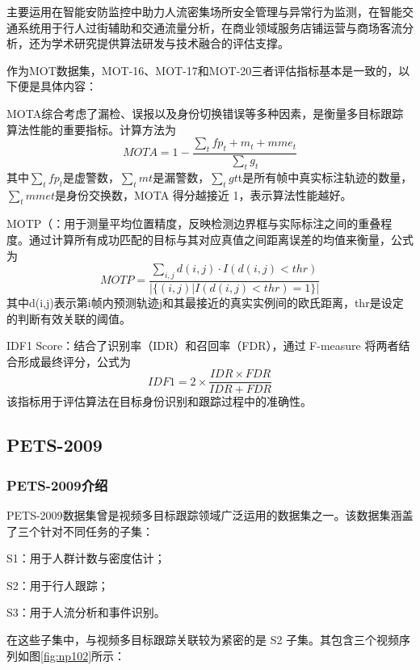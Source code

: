 主要运用在智能安防监控中助力人流密集场所安全管理与异常行为监测，在智能交通系统用于行人过街辅助和交通流量分析，在商业领域服务店铺运营与商场客流分析，还为学术研究提供算法研发与技术融合的评估支撑。




作为MOT数据集，MOT-16、MOT-17和MOT-20三者评估指标基本是一致的，以下便是具体内容：

MOTA综合考虑了漏检、误报以及身份切换错误等多种因素，是衡量多目标跟踪算法性能的重要指标。计算方法为\[MOTA = 1 - \frac{\sum_{t} fp_{t}+m_{t}+mme_{t}}{\sum_{t} g_{t}}\]其中\(\sum_{t} fp_{t}\)是虚警数，\(\sum_{t} m{t}\)是漏警数，\(\sum_{t} g{t}\)t是所有帧中真实标注轨迹的数量，\(\sum_{t} mme{t}\)是身份交换数，MOTA 得分越接近 1，表示算法性能越好。

MOTP（：用于测量平均位置精度，反映检测边界框与实际标注之间的重叠程度。通过计算所有成功匹配的目标与其对应真值之间距离误差的均值来衡量，公式为\[
MOTP = \frac{\sum_{i,j} d(i,j) \cdot I(d(i,j) < thr)}{\left| \{(i,j) | I(d(i,j) < thr) = 1\} \right|}
\]其中d(i,j)表示第i帧内预测轨迹j和其最接近的真实实例间的欧氏距离，thr是设定的判断有效关联的阈值。

IDF1 Score：结合了识别率（IDR）和召回率（FDR），通过 F-measure 将两者结合形成最终评分，公式为\[
IDF1 = 2\times\frac{IDR\times FDR}{IDR + FDR}
\]该指标用于评估算法在目标身份识别和跟踪过程中的准确性。


\subsection{PETS-2009}


\subsubsection{PETS-2009介绍}
PETS-2009\cite{ferryman2009pets2009}数据集曾是视频多目标跟踪领域广泛运用的数据集之一。该数据集涵盖了三个针对不同任务的子集：

S1：用于人群计数与密度估计；

S2：用于行人跟踪；

S3：用于人流分析和事件识别。

在这些子集中，与视频多目标跟踪关联较为紧密的是 S2 子集。其包含三个视频序列如图\ref{fig:np102}所示：


